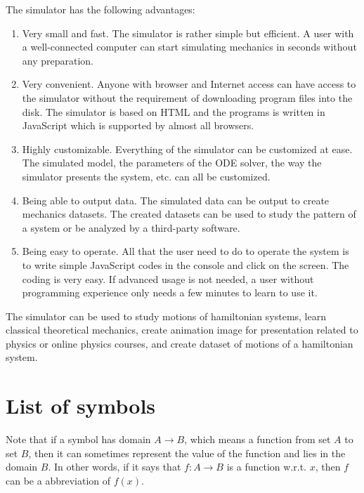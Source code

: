 \documentclass[12pt]{article}
\begin{document}
The simulator has the following advantages:
\begin{enumerate}
  \item Very small and fast.
  The simulator is rather simple but efficient.
  A user with a well-connected computer can start simulating mechanics in seconds without any preparation.

  \item Very convenient.
  Anyone with browser and Internet access can have access to the simulator without the requirement of downloading program files into the disk.
  The simulator is based on HTML and the programs is written in JavaScript which is supported by almost all browsers.

  \item Highly customizable.
  Everything of the simulator can be customized at ease.
  The simulated model, the parameters of the ODE solver, the way the simulator presents the system, etc. can all be customized.

  \item Being able to output data.
  The simulated data can be output to create mechanics datasets.
  The created datasets can be used to study the pattern of a system or be analyzed by a third-party software.

  \item Being easy to operate.
  All that the user need to do to operate the system is to write simple JavaScript codes in the console and click on the screen.
  The coding is very easy.
  If advanced usage is not needed, a user without programming experience only needs a few minutes to learn to use it.
\end{enumerate}

The simulator can be used to study motions of hamiltonian systems,
learn classical theoretical mechanics,
create animation image for presentation related to physics or online physics courses,
and create dataset of motions of a hamiltonian system.

\section{List of symbols}

Note that if a symbol has domain $A\rightarrow B$,
which means a function from set $A$ to set $B$,
then it can sometimes represent the value of the function
and lies in the domain $B$.
In other words, if it says that $f:A\rightarrow B$ is a function w.r.t. $x$,
then $f$ can be a abbreviation of $f\left(x\right)$.
\end{document}
